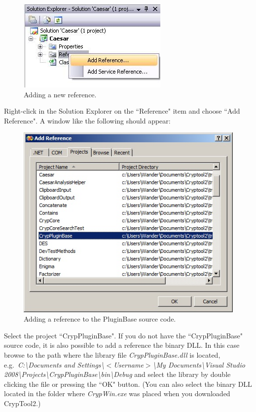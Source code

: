 \begin{figure}[h!]
	\includegraphics{figures/add_reference.jpg}
	\caption{Adding a new reference.}
	\label{fig:add_reference}
\end{figure}

\noindent Right-click in the Solution Explorer on the ``Reference" item and choose ``Add Reference". A window like the following should appear:

\begin{figure}[h!]
	\centering
		\includegraphics{figures/add_pluginbase_source.jpg}
	\caption{Adding a reference to the PluginBase source code.}
	\label{fig:add_pluginbase_source}
\end{figure}
\clearpage

\noindent Select the project ``CrypPluginBase". If you do not have the ``CrypPluginBase" source code, it is also possible to add a reference the binary DLL. In this case browse to the path where the library file \textit{CrypPluginBase.dll} is located, e.g.\ \textit{C:\textbackslash Documents and Settings\textbackslash $<$Username$>$\textbackslash My Documents\textbackslash Visual Studio 2008\textbackslash Projects\textbackslash CrypPluginBase\textbackslash bin\textbackslash Debug} and select the library by double clicking the file or pressing the ``OK" button. (You can also select the binary DLL located in the folder where \textit{CrypWin.exe} was placed when you downloaded CrypTool2.)

